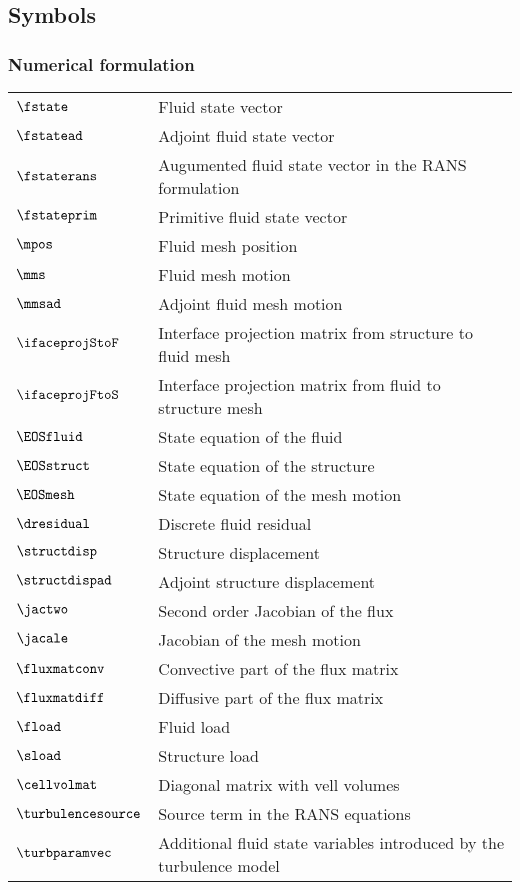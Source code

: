 \subsection*{Symbols}

\subsubsection*{Numerical formulation}
\begin{tabular}{l l}
$\fstate$ & Fluid state vector\\
$\fstatead$ & Adjoint fluid state vector\\
$\fstaterans$ & Augumented fluid state vector in the RANS formulation\\
$\fstateprim$ & Primitive fluid state vector\\
$\mpos$ & Fluid mesh position\\
$\mms$ & Fluid mesh motion\\
$\mmsad$ & Adjoint fluid mesh motion\\
$\ifaceprojStoF$ & Interface projection matrix from structure to fluid mesh\\
$\ifaceprojFtoS$ & Interface projection matrix from fluid to structure mesh\\
$\EOSfluid$ & State equation of the fluid\\
$\EOSstruct$ & State equation of the structure\\
$\EOSmesh$ & State equation of the mesh motion\\
$\dresidual$ & Discrete fluid residual\\
$\structdisp$ & Structure displacement\\
$\structdispad$ & Adjoint structure displacement\\
$\jactwo$ & Second order Jacobian of the flux\\
$\jacale$ & Jacobian of the mesh motion\\
$\fluxmatconv$ & Convective part of the flux matrix\\
$\fluxmatdiff$ & Diffusive part of the flux matrix\\
$\fload$ & Fluid load\\
$\sload$ & Structure load\\
$\cellvolmat$ & Diagonal matrix with vell volumes\\
$\turbulencesource$ & Source term in the \ac{RANS} equations\\
$\turbparamvec$ & Additional fluid state variables introduced by the turbulence model
\end{tabular}

